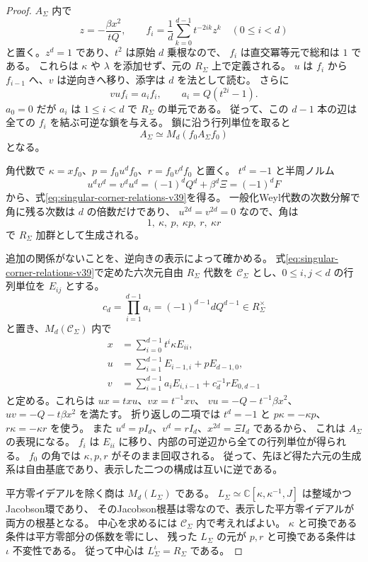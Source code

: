 \begin{proof}
$A_\Sigma$ 内で
\[
 z=-\frac{\beta x^2}{tQ},\qquad
 f_i=\frac1d\sum_{k=0}^{d-1}t^{-2ik}z^k
 \quad(0\le i<d)
\]
と置く。$z^d=1$ であり、$t^2$ は原始 $d$ 乗根なので、
$f_i$ は直交冪等元で総和は $1$ である。
これらは $\kappa$ や $\lambda$ を添加せず、元の $R_\Sigma$ 上で定義される。
$u$ は $f_i$ から $f_{i-1}$ へ、$v$ は逆向きへ移り、添字は $d$ を法として読む。
さらに
\[
 vu f_i=a_i f_i,\qquad a_i=Q(t^{2i}-1).
\]
$a_0=0$ だが $a_i$ は $1\le i<d$ で $R_\Sigma$ の単元である。
従って、この $d-1$ 本の辺は全ての $f_i$ を結ぶ可逆な鎖を与える。
鎖に沿う行列単位を取ると
\[
 A_\Sigma\simeq M_d(f_0A_\Sigma f_0)
\]
となる。

角代数で $\kappa=xf_0$、$p=f_0u^df_0$、$r=f_0v^df_0$ と置く。
$t^d=-1$ と半周ノルム
\[
 u^dv^d=v^du^d=(-1)^dQ^d+\beta^d\Xi=(-1)^dF
\]
から、式\eqref{eq:singular-corner-relations-v39}を得る。
一般化Weyl代数の次数分解で角に残る次数は $d$ の倍数だけであり、
$u^{2d}=v^{2d}=0$ なので、角は
\[
 1,\ \kappa,\ p,\ \kappa p,\ r,\ \kappa r
\]
で $R_\Sigma$ 加群として生成される。

追加の関係がないことを、逆向きの表示によって確かめる。
式\eqref{eq:singular-corner-relations-v39}で定めた六次元自由 $R_\Sigma$ 代数を
$\mathscr C_\Sigma$ とし、$0\le i,j<d$ の行列単位を $E_{ij}$ とする。
\[
 c_d=\prod_{i=1}^{d-1}a_i=(-1)^{d-1}dQ^{d-1}\in R_\Sigma^\times
\]
と置き、$M_d(\mathscr C_\Sigma)$ 内で
\begin{equation}
\label{eq:singular-descent-matrices-v39}
 \begin{aligned}
 x&=\sum_{i=0}^{d-1}t^i\kappa E_{ii},\\
 u&=\sum_{i=1}^{d-1}E_{i-1,i}+pE_{d-1,0},\\
 v&=\sum_{i=1}^{d-1}a_iE_{i,i-1}+c_d^{-1}rE_{0,d-1}
 \end{aligned}
\end{equation}
と定める。これらは $ux=txu$、$vx=t^{-1}xv$、
$vu=-Q-t^{-1}\beta x^2$、$uv=-Q-t\beta x^2$ を満たす。
折り返しの二項では $t^d=-1$ と $p\kappa=-\kappa p$、$r\kappa=-\kappa r$ を使う。
また $u^d=pI_d$、$v^d=rI_d$、$x^{2d}=\Xi I_d$ であるから、
これは $A_\Sigma$ の表現になる。
$f_i$ は $E_{ii}$ に移り、内部の可逆辺から全ての行列単位が得られる。
$f_0$ の角では $\kappa,p,r$ がそのまま回収される。
従って、先ほど得た六元の生成系は自由基底であり、表示した二つの構成は互いに逆である。

平方零イデアルを除く商は $M_d(L_\Sigma)$ である。
$L_\Sigma\simeq\mathbb C[\kappa,\kappa^{-1},J]$ は整域かつJacobson環であり、
そのJacobson根基は零なので、表示した平方零イデアルが両方の根基となる。
中心を求めるには $\mathscr C_\Sigma$ 内で考えればよい。
$\kappa$ と可換である条件は平方零部分の係数を零にし、
残った $L_\Sigma$ の元が $p,r$ と可換である条件は $\iota$ 不変性である。
従って中心は $L_\Sigma^\iota=R_\Sigma$ である。
\end{proof}

